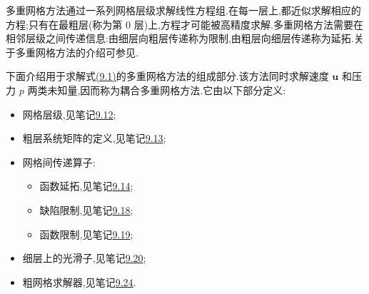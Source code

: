 \begin{note}[多重网格方法]
\label{note:chapter9-multigrid-methods}\label{note:multigrid-method}
多重网格方法通过一系列网格层级求解线性方程组.在每一层上,都近似求解相应的方程;只有在最粗层(称为第 0 层)上,方程才可能被高精度求解.多重网格方法需要在相邻层级之间传递信息:由细层向粗层传递称为限制,由粗层向细层传递称为延拓.关于多重网格方法的介绍可参见\textcite{Hackbusch1985,Trottenberg2001,Briggs2000}.

下面介绍用于求解式\hyperref[eq:chapter9-coupled-system]{(9.1)}的多重网格方法的组成部分.该方法同时求解速度 $\bm u$ 和压力 $p$ 两类未知量,因而称为耦合多重网格方法.它由以下部分定义:
\begin{itemize}
  \item 网格层级,见笔记\hyperref[note:chapter9-grid-hierarchy]{9.12};
  \item 粗层系统矩阵的定义,见笔记\hyperref[note:chapter9-coarse-system-matrices]{9.13};
  \item 网格间传递算子:
  \begin{itemize}
    \item 函数延拓,见笔记\hyperref[note:chapter9-function-prolongation]{9.14};
    \item 缺陷限制,见笔记\hyperref[note:chapter9-defect-restriction]{9.18};
    \item 函数限制,见笔记\hyperref[note:chapter9-function-restriction]{9.19};
  \end{itemize}
  \item 细层上的光滑子,见笔记\hyperref[note:chapter9-vanka-smoother]{9.20};
  \item 粗网格求解器,见笔记\hyperref[note:chapter9-coarse-grid-solver]{9.24}.
\end{itemize}
\end{note}



